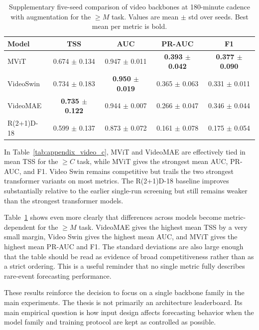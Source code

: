 \begin{table}[!htbp]
\centering
\footnotesize
\caption{Supplementary five-seed comparison of video backbones at 180-minute cadence with augmentation for the $\geq M$ task. Values are mean $\pm$ std over seeds. Best mean per metric is bold.}
\label{tab:appendix_video_m}
\begin{tabular}{lcccc}
\toprule
Model & TSS & AUC & PR-AUC & F1 \\
\midrule
MViT & 0.674 $\pm$ 0.134 & 0.947 $\pm$ 0.011 & \textbf{0.393 $\pm$ 0.042} & \textbf{0.377 $\pm$ 0.090} \\
VideoSwin & 0.734 $\pm$ 0.183 & \textbf{0.950 $\pm$ 0.019} & 0.365 $\pm$ 0.063 & 0.331 $\pm$ 0.011 \\
VideoMAE & \textbf{0.735 $\pm$ 0.122} & 0.944 $\pm$ 0.007 & 0.266 $\pm$ 0.047 & 0.346 $\pm$ 0.044 \\
R(2+1)D-18 & 0.599 $\pm$ 0.137 & 0.873 $\pm$ 0.072 & 0.161 $\pm$ 0.078 & 0.175 $\pm$ 0.054 \\
\bottomrule
\end{tabular}
\end{table}

\FloatBarrier

In Table~\ref{tab:appendix_video_c}, MViT and VideoMAE are effectively tied in mean TSS for the $\geq C$ task, while MViT gives the strongest mean AUC, PR-AUC, and F1. Video Swin remains competitive but trails the two strongest transformer variants on most metrics. The R(2+1)D-18 baseline improves substantially relative to the earlier single-run screening but still remains weaker than the strongest transformer models.

Table~\ref{tab:appendix_video_m} shows even more clearly that differences across models become metric-dependent for the $\geq M$ task. VideoMAE gives the highest mean TSS by a very small margin, Video Swin gives the highest mean AUC, and MViT gives the highest mean PR-AUC and F1. The standard deviations are also large enough that the table should be read as evidence of broad competitiveness rather than as a strict ordering. This is a useful reminder that no single metric fully describes rare-event forecasting performance.

These results reinforce the decision to focus on a single backbone family in the main experiments. The thesis is not primarily an architecture leaderboard. Its main empirical question is how input design affects forecasting behavior when the model family and training protocol are kept as controlled as possible.

